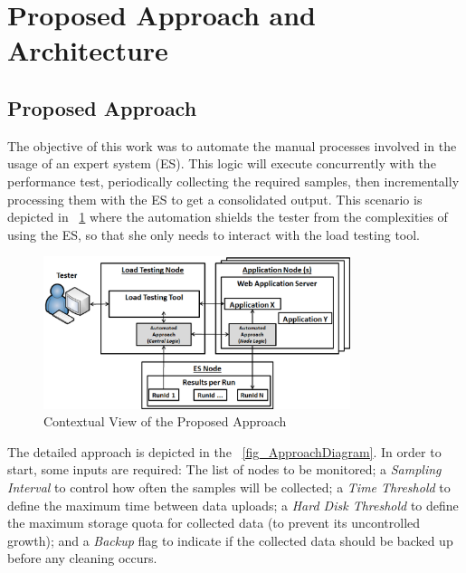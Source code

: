\documentclass[runningheads,a4paper]{llncs}
\begin{document}
\vspace{-7pt}
\section{Proposed Approach and Architecture}
\label{ProposedApproach}
\vspace{-7pt}

\subsection{Proposed Approach}
\vspace{-7pt}
The objective of this work was to automate the manual processes involved
in the usage of an expert system (ES). This logic will execute concurrently with
the performance test, periodically collecting the required samples, then
incrementally processing them with the ES to get a consolidated
output. This scenario is depicted in \figurename ~\ref{fig_Overview} where the
automation shields the tester from the complexities of using the ES, so
that she only needs to interact with the load testing tool.

\vspace{-1pt}
\begin{figure}[!h]
\centering
\includegraphics[totalheight=.18\textheight,width=0.8\textwidth]{architecture_dwait}
\caption{Contextual View of the Proposed Approach}
\label{fig_Overview}
\end{figure}

The detailed approach is depicted in the \figurename
~\ref{fig_ApproachDiagram}. In order to start, some inputs  are required: The list of 
nodes to be monitored; a \emph{Sampling Interval} to control how
often the samples will be collected; a \emph{Time Threshold} to define the maximum 
time between data uploads; a \emph{Hard Disk Threshold} to define the maximum
storage quota for collected data (to prevent its uncontrolled growth); and a
\emph{Backup} flag to indicate if the collected data should be backed up before any 
cleaning occurs.
\end{document}
